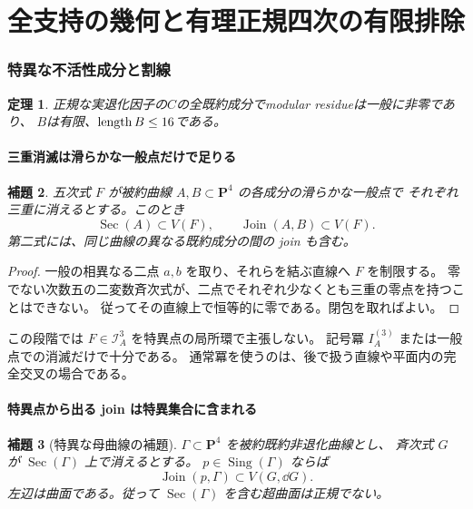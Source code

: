 \documentclass[11pt,a4paper]{ltjsarticle}
\newcommand{\PP}{\mathbf P}\renewcommand{\AA}{\mathbf A}
\newtheorem{theorem}{定理}[section]
\newtheorem{lemma}[theorem]{補題}
\theoremstyle{remark}\newtheorem{remark}[theorem]{注意}
\begin{document}
\part{全支持の幾何と有理正規四次の有限排除}
\section{特異な不活性成分と割線}\label{sec:inactive-singular}
\begin{theorem}\label{thm:finite-B}
正規な実退化因子の$C$の全既約成分でmodular residueは一般に非零であり、
$B$は有限、$\operatorname{length} B\le16$である。
\end{theorem}


\subsection{三重消滅は滑らかな一般点だけで足りる}

\begin{lemma}\label{lem:triple-secant}
五次式 $F$ が被約曲線 $A,B\subset\PP^4$ の各成分の滑らかな一般点で
それぞれ三重に消えるとする。このとき
\[
\operatorname{Sec}(A)\subset V(F),\qquad
\operatorname{Join}(A,B)\subset V(F).
\]
第二式には、同じ曲線の異なる既約成分の間の join も含む。
\end{lemma}
\begin{proof}
一般の相異なる二点 $a,b$ を取り、それらを結ぶ直線へ $F$ を制限する。
零でない次数五の二変数斉次式が、二点でそれぞれ少なくとも三重の零点を持つことはできない。
従ってその直線上で恒等的に零である。閉包を取ればよい。
\end{proof}

この段階では $F\in\mathcal I_A^3$ を特異点の局所環で主張しない。
記号冪 $I_A^{(3)}$ または一般点での消滅だけで十分である。
通常冪を使うのは、後で扱う直線や平面内の完全交叉の場合である。

\subsection{特異点から出る join は特異集合に含まれる}

\begin{lemma}[特異な母曲線の補題]\label{lem:singular-directrix}
$\Gamma\subset\PP^4$ を被約既約非退化曲線とし、
斉次式 $G$ が $\operatorname{Sec}(\Gamma)$ 上で消えるとする。
$p\in\operatorname{Sing}(\Gamma)$ ならば
\begin{equation}\label{eq:join-sing}
\operatorname{Join}(p,\Gamma)\subset V(G,\dd G).
\end{equation}
左辺は曲面である。従って $\operatorname{Sec}(\Gamma)$ を含む超曲面は正規でない。
\end{lemma}
\end{document}
